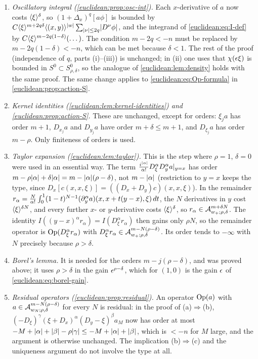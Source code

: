 \begin{enumerate}[label=(\arabic*)]
\item \emph{Oscillatory integral (\cref{euclidean:prop:osc-int}).} Each $x$-derivative of
  $a$ now costs $\langle \xi\rangle^\delta$, so $(1+\Delta_x)^q[a\phi]$ is bounded by
  $C\langle \xi\rangle^{m+2q\delta}\langle (x,y)\rangle^{\lvert w\rvert}\sum_{\lvert \nu\rvert\le2q}\lvert D^\nu\phi\rvert$, and the
  integrand of \eqref{euclidean:eq:I-def} by $C\langle \xi\rangle^{m-2q(1-\delta)}(\dots)$. The
  condition $m-2q<-n$ must be replaced by $m-2q(1-\delta)<-n$, which can be met because
  $\delta<1$. The rest of the proof (independence of $q$, parts (i)--(iii)) is unchanged;
  in (ii) one uses that $\chi(\epsilon\xi)$ is bounded in $S^0\subset S^0_{\rho,\delta}$, so the
  analogue of \cref{euclidean:lem:density} holds with the same proof. The same change
  applies to \eqref{euclidean:eq:Op-formula} in \cref{euclidean:prop:action-S}.
\item \emph{Kernel identities (\cref{euclidean:lem:kernel-identities}) and
  \cref{euclidean:prop:action-S}.} These are unchanged, except for orders: $\xi_ja$ has
  order $m+1$, $D_{x_j}a$ and $D_{y_j}a$ have order $m+\delta\le m+1$, and $D_{\xi_j}a$ has
  order $m-\rho$. Only finiteness of orders is used.
\item \emph{Taylor expansion (\cref{euclidean:lem:taylor}).} This is the step where
  $\rho=1$, $\delta=0$ were used in an essential way. The term
  $\frac{i^{\lvert \alpha\rvert}}{\alpha!}D^\alpha_\xi D^\alpha_ya|_{y=x}$ has order
  $m-\rho\lvert \alpha\rvert+\delta\lvert \alpha\rvert=m-\lvert \alpha\rvert(\rho-\delta)$, not $m-\lvert \alpha\rvert$
  (restriction to $y=x$ keeps the type, since $D_x[c(x,x,\xi)]=((D_x+D_y)c)(x,x,\xi)$). In
  the remainder
  $r_\alpha=\frac N{\alpha!}\int_0^1(1-t)^{N-1}(\partial^\alpha_ya)(x,x+t(y-x),\xi)\,dt$, the $N$
  derivatives in $y$ cost $\langle \xi\rangle^{\delta N}$, and every further $x$- or $y$-derivative
  costs $\langle \xi\rangle^\delta$, so $r_\alpha\in\mathcal{A}^{m+\delta N}_{w_+;\rho,\delta}$. The identity
  $I((y-x)^\alpha r_\alpha)=I(D^\alpha_\xi r_\alpha)$ then gains only $\rho N$, so the
  remainder operator is $\operatorname{Op}(D^\alpha_\xi r_\alpha)$ with
  $D^\alpha_\xi r_\alpha\in\mathcal{A}^{m-N(\rho-\delta)}_{w_+;\rho,\delta}$. Its order tends to
  $-\infty$ with $N$ precisely because $\rho>\delta$.
\item \emph{Borel's lemma.} It is needed for the orders $m-j(\rho-\delta)$, and was
  proved above; it uses $\rho>\delta$ in the gain $\epsilon^{\rho-\delta}$, which for $(1,0)$
  is the gain $\epsilon$ of \eqref{euclidean:eq:borel-gain}.
\item \emph{Residual operators (\cref{euclidean:prop:residual}).} An operator $\operatorname{Op}(a)$
  with $a\in\mathcal{A}^{m-N(\rho-\delta)}_{w_N;\rho,\delta}$ for every $N$ is residual: in the
  proof of (a)$\Rightarrow$(b), $(-D_\xi)^\gamma(\xi+D_x)^\alpha(D_y-\xi)^\beta a_M$ now has
  order at most $-M+\lvert \alpha\rvert+\lvert \beta\rvert-\rho\lvert \gamma\rvert\le-M+\lvert \alpha\rvert+\lvert \beta\rvert$, which is
  $<-n$ for $M$ large, and the argument is otherwise unchanged. The implication
  (b)$\Rightarrow$(c) and the uniqueness argument do not involve the type at all.
\end{enumerate}

